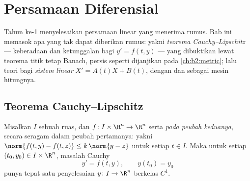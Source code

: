 \chapter{Persamaan Diferensial}\label{ch:b2:diffeq}

Tahun ke-1 menyelesaikan persamaan linear yang menerima rumus. Bab ini
memasok apa yang tak dapat diberikan rumus: yakni \emph{teorema Cauchy--Lipschitz}
--- keberadaan dan ketunggalan bagi $y' = f(t, y)$ --- yang dibuktikan lewat
teorema titik tetap Banach, persis seperti dijanjikan pada
\cref{ch:b2:metric}; lalu teori  bagi \emph{sistem
linear} $X' = A(t)X + B(t)$, dengan  dan
 sebagai mesin hitungnya.

\section{Teorema Cauchy--Lipschitz}

\begin{theorem}\label{thm:b2:diffeq:cauchylipschitz}
Misalkan $I$ sebuah ruas, dan $f \colon I \times \R^n \to \R^n$ 
serta \emph{ pada peubah keduanya}, secara seragam dalam
peubah pertamanya: yakni $\norm{f(t, y) - f(t, z)} \leq k\,\norm{y - z}$ untuk setiap $t
\in I$. Maka untuk setiap $(t_0, y_0) \in I \times \R^n$, masalah
Cauchy
\[
y' = f(t, y), \qquad y(t_0) = y_0
\]
punya tepat satu penyelesaian $y \colon I \to \R^n$ berkelas $C^1$.
\end{theorem}

